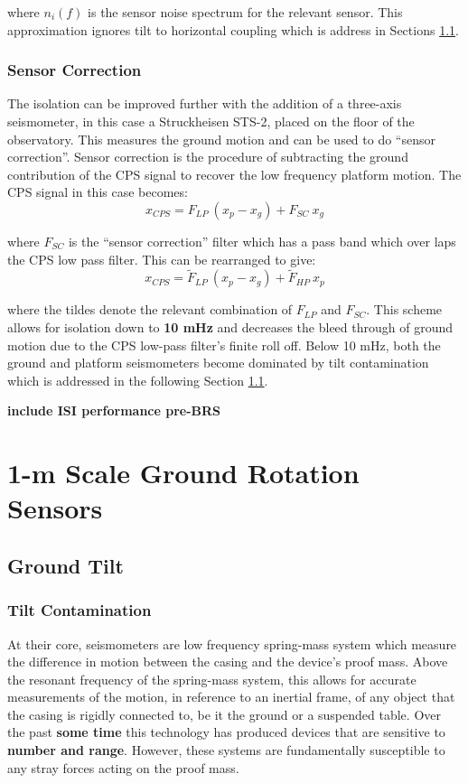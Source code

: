 \documentclass [12pt, proquest]{uwthesis}[2019]
\begin{document}
where $n_{i}(f)$ is the sensor noise spectrum for the relevant sensor. This approximation ignores tilt to horizontal coupling which is address in Sections \ref{tilt}.

\subsection{Sensor Correction}

The isolation can be improved further with the addition of a three-axis seismometer, in this case a Struckheisen STS-2, placed on the floor of the observatory. This measures the ground motion and can be used to do ``sensor correction''. Sensor correction is the procedure of subtracting the ground contribution of the CPS signal to recover the low frequency platform motion. The CPS signal in this case becomes:
\begin{equation}
x_{CPS}=F_{LP}\ (x_p-x_g)+F_{SC}\ x_g
\end{equation}

where $F_{SC}$ is the ``sensor correction'' filter which has a pass band which over laps the CPS low pass filter. This can be rearranged to give:
\begin{equation}
x_{CPS}=\tilde F_{LP}\ (x_p-x_g)+\tilde F_{HP}\ x_p
\end{equation}

where the tildes denote the relevant combination of $F_{LP}$ and $F_{SC}$. This scheme allows for isolation down to \textbf{10 mHz} and decreases the bleed through of ground motion due to the CPS low-pass filter's finite roll off. Below 10 mHz, both the ground and platform seismometers become dominated by tilt contamination which is addressed in the following Section \ref{tilt}.

\textbf{include ISI performance pre-BRS}

\chapter{1-m Scale Ground Rotation Sensors} \label{BRS_chap}
\section{Ground Tilt}\label{tilt}
\subsection{Tilt Contamination}\label{tiltCon}
\quad At their core, seismometers are low frequency spring-mass system which measure the difference in motion between the casing and the device's proof mass. Above the resonant frequency of the spring-mass system, this allows for accurate measurements of the motion, in reference to an inertial frame, of any object that the casing is rigidly connected to, be it the ground or a suspended table. Over the past \textbf{some time} this technology has produced devices that are sensitive to \textbf{number and range}. However, these systems are fundamentally susceptible to any stray forces acting on the proof mass.
\end{document}
